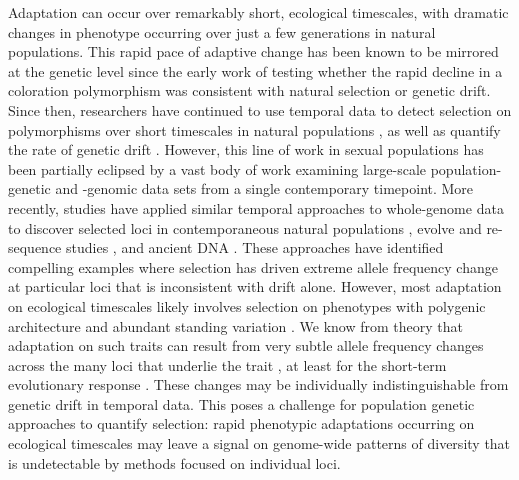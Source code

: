 \documentclass[11pt]{article}
\begin{document}
Adaptation can occur over remarkably short, ecological timescales, with
dramatic changes in phenotype occurring over just a few generations in natural
populations. This rapid pace of adaptive change has been known to be mirrored
at the genetic level since the early work of \textcite{Fisher1947-tf}  testing
whether the rapid decline in a coloration polymorphism was consistent with
natural selection or genetic drift. Since then, researchers have continued to
use temporal data to detect selection on polymorphisms over short timescales in
natural populations
\parencite{Kettlewell1958-or,Kettlewell1961-ok,Fisher1947-tf,Dobzhansky1943-lh,Dobzhansky1971-vf,Mueller1985-eo},
as well as quantify the rate of genetic drift
\parencite{Nei1981-oy,Pollak1983-xh,Mueller1985-eg,Waples1989-sj,Wang2003-ev,Prout1954-yy,Wallace1956-jb}.
However, this line of work in sexual populations has been partially eclipsed by
a vast body of work examining large-scale population-genetic and -genomic data
sets from a single contemporary timepoint. More recently, studies have applied
similar temporal approaches to whole-genome data to discover selected loci in
contemporaneous natural populations
\parencite{Bergland2014-ij,Rajpurohit2018-od}, evolve and re-sequence studies
\parencite{Burke2010-tz,Johansson2010-ya,Teotonio2009-sa,Turner2011-sx,Turner2012-bm,Franssen2017-lx,Orozco-terWengel2012-fu},
and ancient DNA \parencite{Mathieson2015-uw,Fu2016-ek}. These approaches have
identified compelling examples where selection has driven extreme allele
frequency change at particular loci that is inconsistent with drift alone.
However, most adaptation on ecological timescales likely involves selection on
phenotypes with polygenic architecture and abundant standing variation
\parencite{Endler1986-wd,Hendry1999-zu,Kinnison2001-vb,Kopp2009-pj}.  We know
from theory that adaptation on such traits can result from very subtle allele
frequency changes across the many loci that underlie the trait
\parencite{Bulmer1980-zo}, at least for the short-term evolutionary response
\parencite{Jain2017-mw,Jain2015-xy,Thornton2018-eo,Chevin2008-lt,Hermisson2005-hs}.
These changes may be individually indistinguishable from genetic drift in
temporal data. This poses a challenge for population genetic approaches to
quantify selection: rapid phenotypic adaptations occurring on ecological
timescales may leave a signal on genome-wide patterns of diversity that is
undetectable by methods focused on individual loci.
\end{document}
